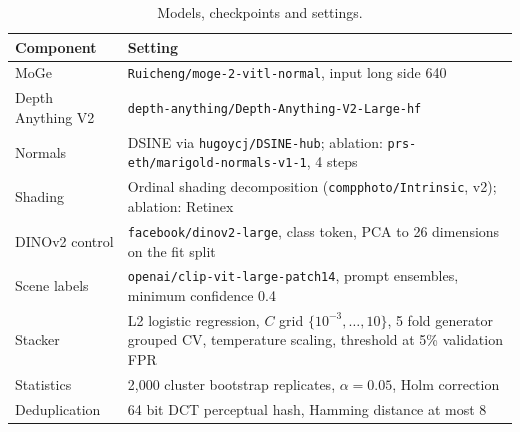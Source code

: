 \documentclass[11pt,a4paper]{article}
\begin{document}
\begin{table}[h]
\centering
\caption{Models, checkpoints and settings.}
\small
\begin{tabularx}{\linewidth}{@{}l X@{}}
\toprule
Component & Setting \\
\midrule
MoGe & \texttt{Ruicheng/moge-2-vitl-normal}, input long side 640 \\
Depth Anything V2 & \texttt{depth-anything/Depth-Anything-V2-Large-hf} \\
Normals & DSINE via \texttt{hugoycj/DSINE-hub}; ablation: \texttt{prs-eth/marigold-normals-v1-1}, 4 steps \\
Shading & Ordinal shading decomposition (\texttt{compphoto/Intrinsic}, v2); ablation: Retinex \\
DINOv2 control & \texttt{facebook/dinov2-large}, class token, PCA to 26 dimensions on the fit split \\
Scene labels & \texttt{openai/clip-vit-large-patch14}, prompt ensembles, minimum confidence 0.4 \\
Stacker & L2 logistic regression, $C$ grid $\{10^{-3},\dots,10\}$, 5 fold generator grouped CV, temperature scaling, threshold at 5\% validation FPR \\
Statistics & 2{,}000 cluster bootstrap replicates, $\alpha = 0.05$, Holm correction \\
Deduplication & 64 bit DCT perceptual hash, Hamming distance at most 8 \\
\bottomrule
\end{tabularx}
\end{table}
\end{document}
